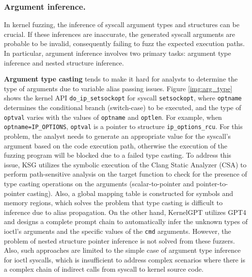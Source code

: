 \subsubsection{Argument inference.}

In kernel fuzzing, the inference of syscall argument types and structures can be crucial. If these inferences are inaccurate, the generated syscall arguments are probable to be invalid, consequently failing to fuzz the expected execution paths. In particular, argument inference involves two primary tasks: argument type inference and nested structure inference.

\textbf{Argument type casting} tends to make it hard for analysts to determine the type of arguments due to variable alias passing issues. Figure \ref{img:arg_type} shows the kernel API \texttt{do\_ip\_setsockopt} for syscall \texttt{setsockopt}, where \texttt{optname} determines the conditional branch (switch-case) to be executed, and the type of \texttt{optval} varies with the values of \texttt{optname} and \texttt{optlen}. For example, when \texttt{optname=IP\_OPTIONS}, \texttt{optval} is a pointer to structure \texttt{ip\_options\_rcu}. For this problem, the analyst needs to generate an appropriate value for the syscall's argument based on the code execution path, otherwise the execution of the fuzzing program will be blocked due to a failed type casting. To address this issue, KSG \cite{sun2022ksg} utilizes the symbolic execution of the Clang Static Analyzer (CSA) to perform path-sensitive analysis on the target function to check for the presence of type casting operations on the arguments (scalar-to-pointer and pointer-to-pointer casting). Also, a global mapping table is constructed for symbols and memory regions, which solves the problem that type casting is difficult to inference due to alias propagation. On the other hand, KernelGPT \cite{yang2023kernelgpt} utilizes GPT4 and designs a complete prompt chain to automatically infer the unknown types of ioctl's arguments and the specific values of the \texttt{cmd} arguments. However, the problem of nested structure pointer inference is not solved from these fuzzers. Also, such approaches are limited to the simple case of argument type inference for ioctl syscalls, which is insufficient to address complex scenarios where there is a complex chain of indirect calls from syscall to kernel source code.

